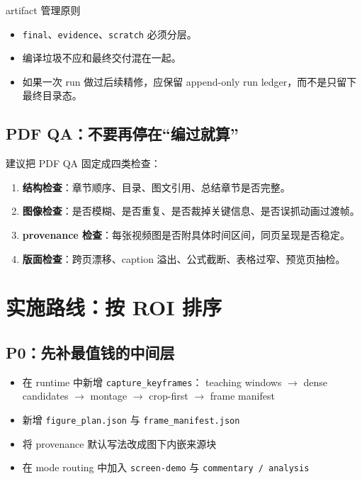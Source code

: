 \documentclass[a4paper]{article}
\begin{document}
\begin{riskbox}{artifact 管理原则}
\begin{itemize}
\item \texttt{final}、\texttt{evidence}、\texttt{scratch} 必须分层。
\item 编译垃圾不应和最终交付混在一起。
\item 如果一次 run 做过后续精修，应保留 append-only run ledger，而不是只留下最终目录态。
\end{itemize}
\end{riskbox}

\subsection{PDF QA：不要再停在“编过就算”}

建议把 PDF QA 固定成四类检查：

\begin{enumerate}
\item \textbf{结构检查}：章节顺序、目录、图文引用、总结章节是否完整。
\item \textbf{图像检查}：是否模糊、是否重复、是否裁掉关键信息、是否误抓动画过渡帧。
\item \textbf{provenance 检查}：每张视频图是否附具体时间区间，同页呈现是否稳定。
\item \textbf{版面检查}：跨页漂移、caption 溢出、公式截断、表格过窄、预览页抽检。
\end{enumerate}

\section{实施路线：按 ROI 排序}

\subsection{P0：先补最值钱的中间层}

\begin{itemize}
\item 在 runtime 中新增 \texttt{capture\_keyframes}：
  teaching windows $\rightarrow$ dense candidates $\rightarrow$ montage $\rightarrow$ crop-first $\rightarrow$ frame manifest
\item 新增 \texttt{figure\_plan.json} 与 \texttt{frame\_manifest.json}
\item 将 provenance 默认写法改成图下内嵌来源块
\item 在 mode routing 中加入 \texttt{screen-demo} 与 \texttt{commentary / analysis}
\end{itemize}
\end{document}
